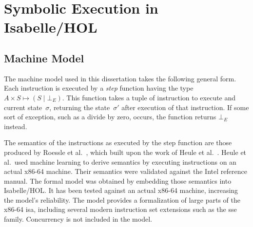 \chapter{Symbolic Execution in Isabelle/HOL}

\section{Machine Model}
The machine model used in this dissertation takes the following general form.
Each instruction is executed by a \emph{step} function having the type
$A\times S\mapsto(S\mid\bot_E)$.%
%
%
This function takes a tuple of instruction to execute and current state~$\sigma$,
returning the state~$\sigma'$ after execution of that instruction.
If some sort of exception, such as a divide by zero, occurs,
the function returns $\bot_E$ instead.

The semantics of the instructions as executed by the step function
are those produced by Roessle et al.~\citep{roessle2019},
which built upon the work of Heule et al.~\citep{heule2016}.
Heule et al.\ used machine learning to derive semantics
by executing instructions on an actual x86-64 machine.
Their semantics were validated against the Intel reference manual.
The formal model was obtained by embedding those semantics into Isabelle/HOL.
It has been tested against an actual x86-64 machine, increasing the model's reliability.
The model provides a formalization of large parts of the x86-64 \ac{isa},
including several modern instruction set extensions such as the \ac{sse} family.
Concurrency is not included in the model.

